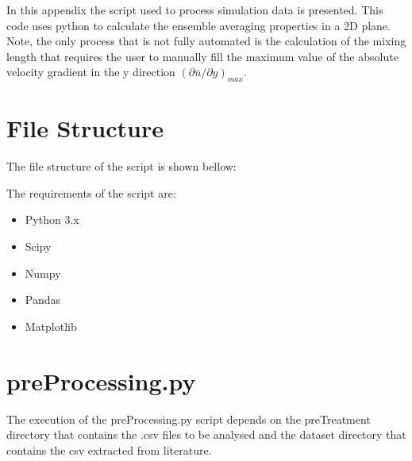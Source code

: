 \noindent
In this appendix the script used to process simulation data is presented. This code uses python to calculate the ensemble averaging properties in a 2D plane. Note, the only process that is not fully automated is the calculation of the mixing length that requires the user to manually fill the maximum value of the absolute velocity gradient in the y direction $({\partial \bar u}/{\partial y})_{max}$.

\section{File Structure}
\noindent
The file structure of the script is shown bellow:
\\
\noindent

The requirements of the script are:
\begin{itemize}
\item Python 3.x
\item Scipy
\item Numpy
\item Pandas
\item Matplotlib
\end{itemize}
\noindent

\section{preProcessing.py}
The execution of the preProcessing.py script depends on the preTreatment directory that contains the .csv files to be analysed and the dataset directory that contains the csv extracted from literature.

